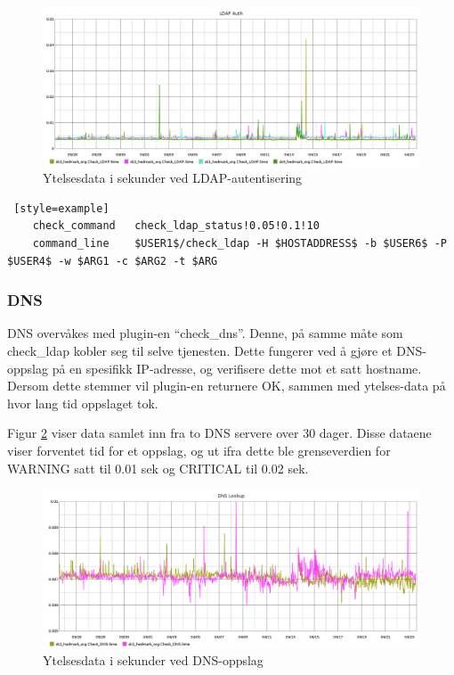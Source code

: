 \begin{figure}[H]
    \centering
    \includegraphics[width=1.0\textwidth]{img/ldap-auth-inv}
    \caption{Ytelsesdata i sekunder ved LDAP-autentisering}
    \label{ldapauth-inv}
\end{figure}
\begin{lstlisting} [style=example]
    check_command 	check_ldap_status!0.05!0.1!10
    command_line    $USER1$/check_ldap -H $HOSTADDRESS$ -b $USER6$ -P $USER4$ -w $ARG1 -c $ARG2 -t $ARG
\end{lstlisting}

\subsubsection*{DNS}
DNS overvåkes med plugin-en ``check\_dns''. Denne, på samme måte som check\_ldap kobler seg til selve tjenesten. Dette fungerer ved å gjøre et DNS-oppslag på en spesifikk IP-adresse, og verifisere dette mot et satt hostname. Dersom dette stemmer vil plugin-en returnere OK, sammen med ytelses-data på hvor lang tid oppslaget tok.

Figur \ref{dns-inv} viser data samlet inn fra to DNS servere over 30 dager. Disse dataene viser forventet tid for et oppslag, og ut ifra dette ble grenseverdien for WARNING satt til 0.01 sek og CRITICAL til 0.02 sek.

\begin{figure}[H]
    \centering
    \includegraphics[width=1.0\textwidth]{img/dns-inv}
    \caption{Ytelsesdata i sekunder ved DNS-oppslag}
    \label{dns-inv}
\end{figure}

